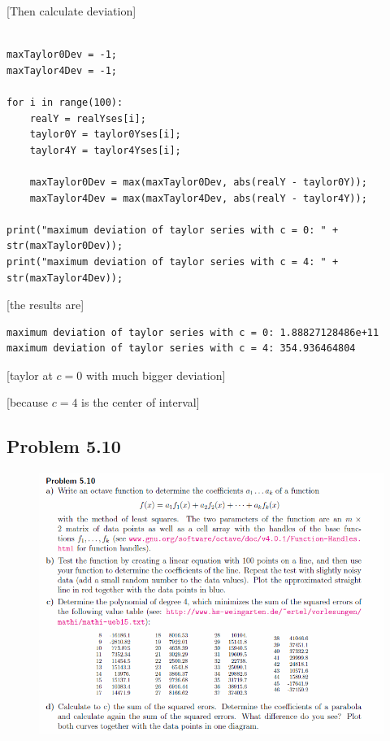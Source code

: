 [Then calculate deviation]

\begin{lstlisting}[caption=todo]

maxTaylor0Dev = -1;
maxTaylor4Dev = -1;

for i in range(100):
	realY = realYses[i];
	taylor0Y = taylor0Yses[i];
	taylor4Y = taylor4Yses[i];
	
	maxTaylor0Dev = max(maxTaylor0Dev, abs(realY - taylor0Y));
	maxTaylor4Dev = max(maxTaylor4Dev, abs(realY - taylor4Y));

print("maximum deviation of taylor series with c = 0: " + str(maxTaylor0Dev));
print("maximum deviation of taylor series with c = 4: " + str(maxTaylor4Dev));
\end{lstlisting}

[the results are]

\begin{lstlisting}[caption=Result of 1.1 a), keywordstyle=\color{black}]
maximum deviation of taylor series with c = 0: 1.88827128486e+11
maximum deviation of taylor series with c = 4: 354.936464804
\end{lstlisting}

[taylor at $c = 0$ with much bigger deviation]

[because $c = 4$ is the center of interval]


\subsection{Problem 5.10}


\begin{figure}[!ht]
\includegraphics[width=1\textwidth]{chapters/images/desc-5-10}
\end{figure}


